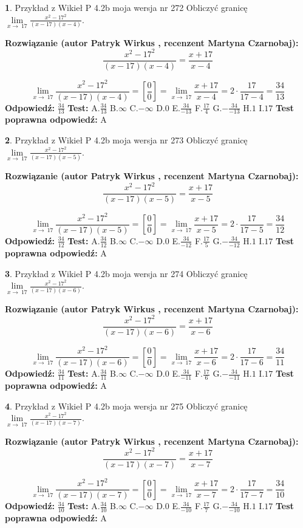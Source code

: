\documentclass[12pt, a4paper]{article}
\theoremstyle{definition} %
\newtheorem{zad}{}
\newcommand{\zadStart}[1]{\begin{zad}#1\newline}
\newcommand{\zadStop}{\end{zad}}
\newcommand{\rozwStart}[2]{\noindent \textbf{Rozwiązanie (autor #1 , recenzent #2): }\newline}
\newcommand{\rozwStop}{\newline}
\newcommand{\odpStart}{\noindent \textbf{Odpowiedź:}\newline}
\newcommand{\odpStop}{\newline}
\newcommand{\testStart}{\noindent \textbf{Test:}\newline}
\newcommand{\testStop}{\newline}
\newcommand{\kluczStart}{\noindent \textbf{Test poprawna odpowiedź:}\newline}
\newcommand{\kluczStop}{\newline}
\begin{document}
\zadStart{Przykład z Wikieł P 4.2b moja wersja nr 272}
Obliczyć granicę $\lim\limits_{x\to\ 17}\frac{x^{2}-17^{2}}{(x-17)(x-4)}$.
\zadStop
\rozwStart{Patryk Wirkus}{Martyna Czarnobaj}
$$\frac{x^{2}-17^{2}}{(x-17)(x-4)}=\frac{x+17}{x-4}$$

$$\lim\limits_{x\to\ 17}\frac{x^{2}-17^{2}}{(x-17)(x-4)}=[\frac{0}{0}]=\lim\limits_{x\to\ 17}\frac{x+17}{x-4}=2 \cdot \frac{17}{17-4} = \frac{34}{13}$$
\rozwStop
\odpStart
$\frac{34}{13}$
\odpStop
\testStart
A.$\frac{34}{13}$
B.$\infty$
C.$-\infty$
D.$0$
E.$\frac{34}{-13}$
F.$\frac{17}{4}$
G.$-\frac{34}{-13}$
H.$1$
I.$17$
\testStop
\kluczStart
A
\kluczStop



\zadStart{Przykład z Wikieł P 4.2b moja wersja nr 273}
Obliczyć granicę $\lim\limits_{x\to\ 17}\frac{x^{2}-17^{2}}{(x-17)(x-5)}$.
\zadStop
\rozwStart{Patryk Wirkus}{Martyna Czarnobaj}
$$\frac{x^{2}-17^{2}}{(x-17)(x-5)}=\frac{x+17}{x-5}$$

$$\lim\limits_{x\to\ 17}\frac{x^{2}-17^{2}}{(x-17)(x-5)}=[\frac{0}{0}]=\lim\limits_{x\to\ 17}\frac{x+17}{x-5}=2 \cdot \frac{17}{17-5} = \frac{34}{12}$$
\rozwStop
\odpStart
$\frac{34}{12}$
\odpStop
\testStart
A.$\frac{34}{12}$
B.$\infty$
C.$-\infty$
D.$0$
E.$\frac{34}{-12}$
F.$\frac{17}{5}$
G.$-\frac{34}{-12}$
H.$1$
I.$17$
\testStop
\kluczStart
A
\kluczStop



\zadStart{Przykład z Wikieł P 4.2b moja wersja nr 274}
Obliczyć granicę $\lim\limits_{x\to\ 17}\frac{x^{2}-17^{2}}{(x-17)(x-6)}$.
\zadStop
\rozwStart{Patryk Wirkus}{Martyna Czarnobaj}
$$\frac{x^{2}-17^{2}}{(x-17)(x-6)}=\frac{x+17}{x-6}$$

$$\lim\limits_{x\to\ 17}\frac{x^{2}-17^{2}}{(x-17)(x-6)}=[\frac{0}{0}]=\lim\limits_{x\to\ 17}\frac{x+17}{x-6}=2 \cdot \frac{17}{17-6} = \frac{34}{11}$$
\rozwStop
\odpStart
$\frac{34}{11}$
\odpStop
\testStart
A.$\frac{34}{11}$
B.$\infty$
C.$-\infty$
D.$0$
E.$\frac{34}{-11}$
F.$\frac{17}{6}$
G.$-\frac{34}{-11}$
H.$1$
I.$17$
\testStop
\kluczStart
A
\kluczStop



\zadStart{Przykład z Wikieł P 4.2b moja wersja nr 275}
Obliczyć granicę $\lim\limits_{x\to\ 17}\frac{x^{2}-17^{2}}{(x-17)(x-7)}$.
\zadStop
\rozwStart{Patryk Wirkus}{Martyna Czarnobaj}
$$\frac{x^{2}-17^{2}}{(x-17)(x-7)}=\frac{x+17}{x-7}$$

$$\lim\limits_{x\to\ 17}\frac{x^{2}-17^{2}}{(x-17)(x-7)}=[\frac{0}{0}]=\lim\limits_{x\to\ 17}\frac{x+17}{x-7}=2 \cdot \frac{17}{17-7} = \frac{34}{10}$$
\rozwStop
\odpStart
$\frac{34}{10}$
\odpStop
\testStart
A.$\frac{34}{10}$
B.$\infty$
C.$-\infty$
D.$0$
E.$\frac{34}{-10}$
F.$\frac{17}{7}$
G.$-\frac{34}{-10}$
H.$1$
I.$17$
\testStop
\kluczStart
A
\kluczStop
\end{document}

